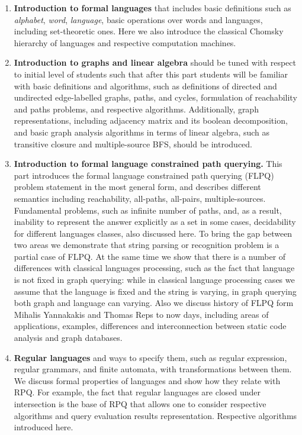 \documentclass[sigconf]{acmart}
\begin{document}
\begin{enumerate}
  \item \label{fl_intro} \textbf{Introduction to formal languages} that includes basic definitions such as \emph{alphabet}, \emph{word}, \emph{language}, basic operations over words and languages, including set-theoretic ones. 
  Here we also introduce the classical Chomsky hierarchy of languages and respective computation machines.
  
  \item \label{graphs_intro} \textbf{Introduction to graphs and linear algebra} should be tuned with respect to initial level of students such that after this part students will be familiar with basic definitions and algorithms, such as definitions of directed and undirected edge-labelled graphs, paths, and cycles, formulation of reachability and paths problems, and respective algorithms. 
  Additionally, graph representations, including adjacency matrix and its boolean decomposition, and basic graph analysis algorithms in terms of linear algebra, such as transitive closure and multiple-source BFS, should be introduced.
  
  \item \label{flpq_intro} \textbf{Introduction to formal language constrained path querying.} 
  This part introduces the formal language constrained path querying (FLPQ)~\cite{doi:10.1137/S0097539798337716} problem statement in the most general form, and describes different semantics including reachability, all-paths, all-pairs, multiple-sources. 
  Fundamental problems, such as infinite number of paths, and, as a result, inability to represent the answer explicitly as a set in some cases, decidability for different languages classes, also discussed here. 
  To bring the gap between two areas we demonstrate that string parsing or recognition problem is a partial case of FLPQ. 
  At the same time we show that there is a number of differences with classical languages processing, such as the fact that language is not fixed in graph querying: while in classical language processing cases we assume that the language is fixed and the string is varying, in graph querying both graph and language can varying.
  Also we discuss history of FLPQ form Mihalis Yannakakis and Thomas Reps to now days, including areas of applications, examples, differences and interconnection between static code analysis and graph databases.

  \item \label{regular_languages_intro} \textbf{Regular languages} and ways to specify them, such as regular expression, regular grammars, and finite automata, with transformations between them. 
  We discuss formal properties of languages and show how they relate with RPQ.
  For example, the fact that regular languages are closed under intersection is the base of RPQ that allows one to consider respective algorithms and query evaluation results representation.
  Respective algorithms introduced here.
  

\end{enumerate}
\end{document}
